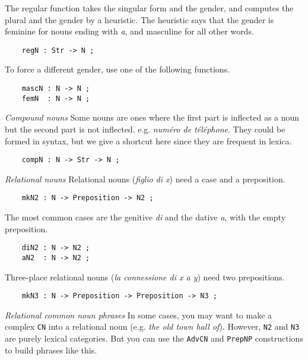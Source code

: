 \documentclass[11pt,a4paper]{article}
\newcommand{\subsubsubsection}[1]{\textit{#1}}
\begin{document}
The regular function takes the singular form and the gender,
and computes the plural and the gender by a heuristic. 
The heuristic says that the gender is feminine for nouns
ending with \textit{a}, and masculine for all other words.

\begin{verbatim}
    regN : Str -> N ;
\end{verbatim}

To force a different gender, use one of the following functions.

\begin{verbatim}
    mascN : N -> N ;
    femN  : N -> N ;
\end{verbatim}

\subsubsubsection{Compound nouns}
Some nouns are ones where the first part is inflected as a noun but
the second part is not inflected. e.g. \textit{numéro de téléphone}. 
They could be formed in syntax, but we give a shortcut here since
they are frequent in lexica.

\begin{verbatim}
    compN : N -> Str -> N ;
\end{verbatim}

\subsubsubsection{Relational nouns}
Relational nouns (\textit{figlio di x}) need a case and a preposition. 

\begin{verbatim}
    mkN2 : N -> Preposition -> N2 ;
\end{verbatim}

The most common cases are the genitive \textit{di} and the dative \textit{a}, 
with the empty preposition.

\begin{verbatim}
    diN2 : N -> N2 ;
    aN2  : N -> N2 ;
\end{verbatim}

Three-place relational nouns (\textit{la connessione di x a y}) need two prepositions.

\begin{verbatim}
    mkN3 : N -> Preposition -> Preposition -> N3 ;
\end{verbatim}

\subsubsubsection{Relational common noun phrases}
In some cases, you may want to make a complex \texttt{CN} into a
relational noun (e.g. \textit{the old town hall of}). However, \texttt{N2} and
\texttt{N3} are purely lexical categories. But you can use the \texttt{AdvCN}
and \texttt{PrepNP} constructions to build phrases like this.
\end{document}
